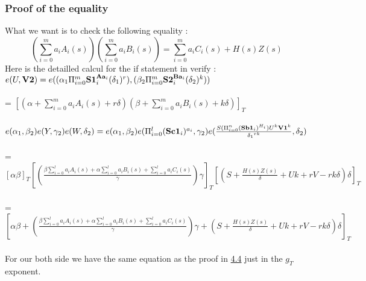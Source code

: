 \subsubsection{Proof of the equality}
What we want is to check the following equality :
\[ (\sum_{i=0}^m a_i A_i(s)) (\sum_{i=0}^m a_i B_i(s)) = \sum_{i=0}^m a_i C_i(s) + H(s) Z(s) \]
Here is the detailled calcul for the if statement in verify :
\\ $e(U,\textbf{V2}) = e((\textbf{$\alpha_1$} \Pi_{i=0}^{m} \textbf{S1}_i^{\textbf{Aa}_i} (\textbf{$\delta_1$})^r), (\textbf{$\beta_2$} \Pi_{i=0}^{m} \textbf{S2}_i^{\textbf{Ba}_i} (\textbf{$\delta_2$})^k)) $
\\
\\ = $ [(\alpha + \sum_{i=0}^{m} a_i A_i (s) + r\delta) (\beta + \sum_{i=0}^{m} a_i B_i (s) + k\delta)]_T$
\\ 
\\ $e(\textbf{$\alpha_1$}, \textbf{$\beta_2$}) e(Y, \textbf{$\gamma_2$})  e(W, \textbf{$\delta_2$}) = e(\textbf{$\alpha_1$}, \textbf{$\beta_2$}) e(\Pi_{i=0}^{l}(\textbf{Sc1}_i)^{a_i}, \textbf{$\gamma_2$}) e(\frac{S (\Pi_{i=0}^n (\textbf{Sb1}_i)^{H_i}) U^k \textbf{V1}^k}{\textbf{$\delta_1$}^{rk}}, \textbf{$\delta_2$})$
\\
\\ = $[\alpha \beta]_T [(\frac{\beta \sum_{i=0}^{l} a_i A_i (s) + \alpha \sum_{i=0}^{l} a_i B_i(s) + \sum_{i=0}^{l} a_i C_i(s) }{\gamma}) \gamma]_T  [(S + \frac{H(s)Z(s)}{\delta} + Uk + rV - rk\delta) \delta]_T$
\\
\\= $[\alpha \beta + (\frac{\beta \sum_{i=0}^{l} a_i A_i (s) + \alpha \sum_{i=0}^{l} a_i B_i(s) + \sum_{i=0}^{l} a_i C_i(s) }{\gamma}) \gamma + (S + \frac{H(s)Z(s)}{\delta} + Uk + rV - rk\delta) \delta]_T$
\\\\For our both side we have the same equation as the proof in \hyperref[sec:EquationProofNotInZK]{4.4} just in the $g_T$ exponent.
